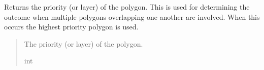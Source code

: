 \documentclass[letterpaper,10pt,english]{sphinxmanual}
\begin{document}
\begin{fulllineitems}
\begin{fulllineitems}
\label{\detokenize{modules/gps/zones:qnav.gps.zones.Polygon.priority}}
\pysigstartsignatures
{}
\pysigstopsignatures
\sphinxAtStartPar
Returns the priority (or layer) of the polygon.
This is used for determining the outcome when multiple polygons
overlapping one another are involved. When this occurs the highest
priority polygon is used.
\begin{quote}\begin{description}
\sphinxAtStartPar
The priority (or layer) of the polygon.

\sphinxAtStartPar
int

\end{description}\end{quote}

\end{fulllineitems}


\end{fulllineitems}

\end{document}
